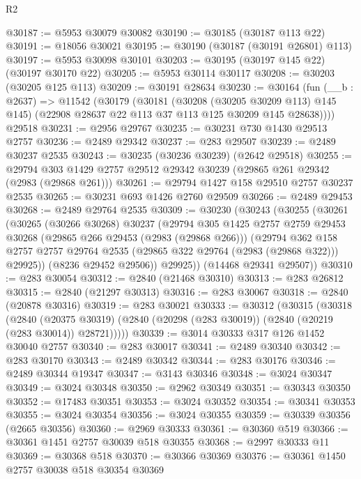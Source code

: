 \begin{lexlean}{R2}
\begin{coremodule}
@30187 := @5953 @30079 @30082
@30190 := @30185 (@30187 @113 @22)
@30191 := @18056 @30021
@30195 := @30190 (@30187 (@30191 @26801) @113)
@30197 := @5953 @30098 @30101
@30203 := @30195 (@30197 @145 @22) (@30197 @30170 @22)
@30205 := @5953 @30114 @30117
@30208 := @30203 (@30205 @125 @113)
@30209 := @30191 @28634
@30230 := @30164
    (fun (__b : @2637) =>
    @11542
      (@30179
        (@30181
          (@30208 (@30205 @30209 @113) @145 @145)
          (@22908 @28637 @22 @113 @37 @113 @125 @30209 @145 @28638))))
    @29518
@30231 := @2956 @29767
@30235 := @30231 @730 @1430 @29513 @2757
@30236 := @2489 @29342
@30237 := @283 @29507
@30239 := @2489 @30237 @2535
@30243 := @30235 (@30236 @30239) (@2642 @29518)
@30255 := @29794 @303 @1429 @2757 @29512 @29342 @30239 (@29865 @261 @29342 (@2983 (@29868 @261)))
@30261 := @29794 @1427 @158 @29510 @2757 @30237 @2535
@30265 := @30231 @693 @1426 @2760 @29509
@30266 := @2489 @29453
@30268 := @2489 @29764 @2535
@30309 := @30230
    (@30243
      (@30255
        (@30261
          (@30265
            (@30266 @30268)
            @30237
            (@29794
              @305
              @1425
              @2757
              @2759
              @29453
              @30268
              (@29865 @266 @29453 (@2983 (@29868 @266)))
              (@29794
                @362
                @158
                @2757
                @2757
                @29764
                @2535
                (@29865 @322 @29764 (@2983 (@29868 @322)))
                @29925))
            (@8236 @29452 @29506))
          @29925))
      (@14468 @29341 @29507))
@30310 := @283 @30054
@30312 := @2840 (@21468 @30310)
@30313 := @283 @26812
@30315 := @2840 (@21297 @30313)
@30316 := @283 @30067
@30318 := @2840 (@20878 @30316)
@30319 := @283 @30021
@30333 := @30312
    (@30315
      (@30318
        (@2840
          (@20375 @30319)
          (@2840 (@20298 (@283 @30019)) (@2840 (@20219 (@283 @30014)) @28721)))))
@30339 := @3014 @30333 @317 @126 @1452 @30040 @2757
@30340 := @283 @30017
@30341 := @2489 @30340
@30342 := @283 @30170
@30343 := @2489 @30342
@30344 := @283 @30176
@30346 := @2489 @30344 @19347
@30347 := @3143 @30346
@30348 := @3024 @30347
@30349 := @3024 @30348
@30350 := @2962 @30349
@30351 := @30343 @30350
@30352 := @17483 @30351
@30353 := @3024 @30352
@30354 := @30341 @30353
@30355 := @3024 @30354
@30356 := @3024 @30355
@30359 := @30339 @30356 (@2665 @30356)
@30360 := @2969 @30333
@30361 := @30360 @519
@30366 := @30361 @1451 @2757 @30039 @518 @30355
@30368 := @2997 @30333 @11
@30369 := @30368 @518
@30370 := @30366 @30369
@30376 := @30361 @1450 @2757 @30038 @518 @30354 @30369

\end{coremodule}
\end{lexlean}

